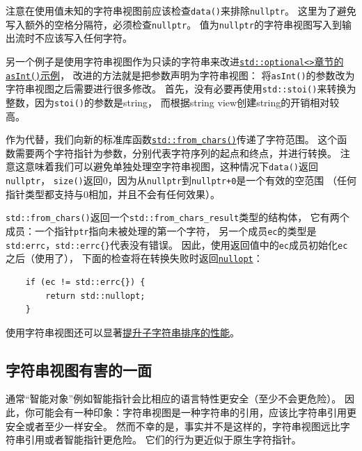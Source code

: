 注意在使用值未知的字符串视图前应该检查\texttt{data()}来排除\texttt{nullptr}。
这里为了避免写入额外的空格分隔符，必须检查\texttt{nullptr}。
值为\texttt{nullptr}的字符串视图写入到输出流时不应该写入任何字符。

另一个例子是使用字符串视图作为只读的字符串来改进\hyperref[ch15.1.1]
{\texttt{std::optional<>}章节的\texttt{asInt()}示例}，
改进的方法就是把参数声明为字符串视图：\label{改进asInt}
将\texttt{asInt()}的参数改为字符串视图之后需要进行很多修改。
首先，没有必要再使用\texttt{std::stoi()}来转换为整数，因为\texttt{stoi()}的参数是string，
而根据string view创建string的开销相对较高。

作为代替，我们向新的标准库函数\hyperref[ch31.2.1]{\texttt{std::from\_chars()}}传递了字符范围。
这个函数需要两个字符指针为参数，分别代表字符序列的起点和终点，并进行转换。
注意这意味着我们可以避免单独处理空字符串视图，这种情况下\texttt{data()}返回\texttt{nullptr}，
\texttt{size()}返回0，因为从\texttt{nullptr}到\texttt{nullptr+0}是一个有效的空范围
（任何指针类型都支持与0相加，并且不会有任何效果）。

\texttt{std::from\_chars()}返回一个\texttt{std::from\_chars\_result}类型的结构体，
它有两个成员：一个指针\texttt{ptr}指向未被处理的第一个字符，
另一个成员\texttt{ec}的类型是\texttt{std:errc}，\texttt{std::errc\{\}}代表没有错误。
因此，使用返回值中的\texttt{ec}成员初始化\texttt{ec}之后（使用了），
下面的检查将在转换失败时返回\hyperref[nullopt]{\texttt{nullopt}}：
\begin{lstlisting}
    if (ec != std::errc{}) {
        return std::nullopt;
    }
\end{lstlisting}
使用字符串视图还可以显著\hyperref[ch22.1.2.1]{提升子字符串排序的性能}。

\subsection{字符串视图有害的一面}\label{ch19.3.1}
通常“智能对象”例如智能指针会比相应的语言特性更安全（至少不会更危险）。
因此，你可能会有一种印象：字符串视图是一种字符串的引用，应该比字符串引用更安全或者至少一样安全。
然而不幸的是，事实并不是这样的，字符串视图远比字符串引用或者智能指针更危险。
它们的行为更近似于原生字符指针。

